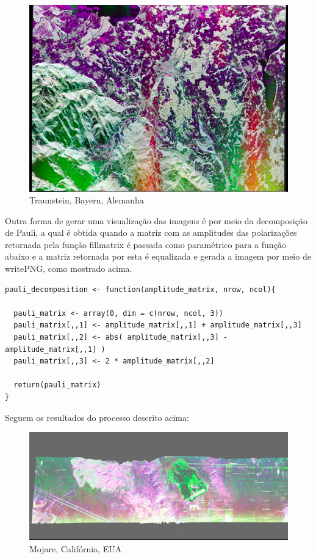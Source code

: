 \documentclass[12pt]{article}
\begin{document}
\begin{figure}[!ht]
	\begin{center}
		\includegraphics[width = 120mm, scale = 0.5]{../../Images/Report_07_18/mlc_image_low_resolution} \\ 
        Traunstein, Bayern, Alemanha\\
	\end{center}
\end{figure}
Outra forma de gerar uma visualização das imagens é por meio da decomposição de Pauli, a qual é obtida quando a matriz com as amplitudes das polarizações retornada pela função fill\textunderscore matrix é passada como paramétrico para a função abaixo e a matriz retornada por esta é equalizada e gerada a imagem por meio de writePNG, como mostrado acima.

\begin{verbatim}
pauli_decomposition <- function(amplitude_matrix, nrow, ncol){

  pauli_matrix <- array(0, dim = c(nrow, ncol, 3))
  pauli_matrix[,,1] <- amplitude_matrix[,,1] + amplitude_matrix[,,3]
  pauli_matrix[,,2] <- abs( amplitude_matrix[,,3] - amplitude_matrix[,,1] )
  pauli_matrix[,,3] <- 2 * amplitude_matrix[,,2]
  
  return(pauli_matrix)
}
\end{verbatim}
Seguem os resultados do processo descrito acima:
\begin{figure}[!ht]
	\begin{center}
		\includegraphics[width = 120mm, scale = 0.5]{../../Images/Report_07_18/grd_pauli_image_low_resolution} \\ 
        Mojare, Califórnia, EUA\\
	\end{center}
\end{figure}
\end{document}
